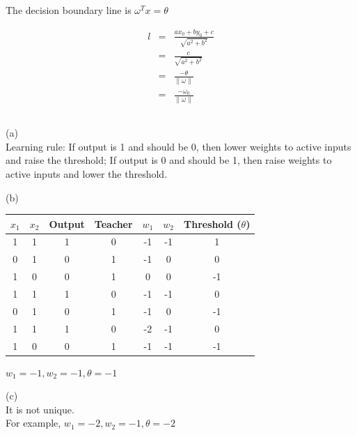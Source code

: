 \documentclass{article} %
\begin{document}
The decision boundary line is $\omega ^ T x  =  \theta$

\begin{equation}
    \begin{array}{rcl}
      	l & = & \frac{ax_0 + by_0 + c}{\sqrt{a^2+b^2}} \\
	& = & \frac{c}{\sqrt{a^2+b^2}} \\
	& = & \frac {-\theta}{\lVert \omega \rVert} \\
	& = & \frac {-\omega_0}{\lVert \omega \rVert}
    \end{array}
\end{equation}

\subsection{}
(a) \\
Learning rule: If output is 1 and should be 0, then lower weights to active inputs and raise the threshold; 
If output is 0 and should be 1, then raise weights to active inputs and lower the threshold.

(b) \\

\begin{center}

\begin{tabular}{ | c | c | c | c | c | c | c |}
  \hline			
  $x_1$ & $x_2$ & Output & Teacher & $w_1$ & $w_2$ & Threshold ($\theta$) \\ \hline
  1 & 1 & 1 & 0 & -1 & -1 & 1 \\ \hline
  0 & 1 & 0 & 1 & -1 & 0 & 0 \\ \hline
  1 & 0 & 0 & 1 & 0 & 0 & -1 \\ \hline
  1 & 1 & 1 & 0 & -1 & -1 & 0 \\ \hline
  0 & 1 & 0 & 1 & -1 & 0 & -1 \\ \hline
  1 & 1 & 1 & 0 & -2 & -1 & 0 \\ \hline
  1 & 0 & 0 & 1 & -1 & -1 & -1 \\ \hline
\end{tabular}

\end{center}

$w_1 = -1, w_2 = -1, \theta = -1$

(c) \\
It is not unique. \\

For example, $w_1 = -2, w_2 = -1, \theta = -2$
\end{document}
